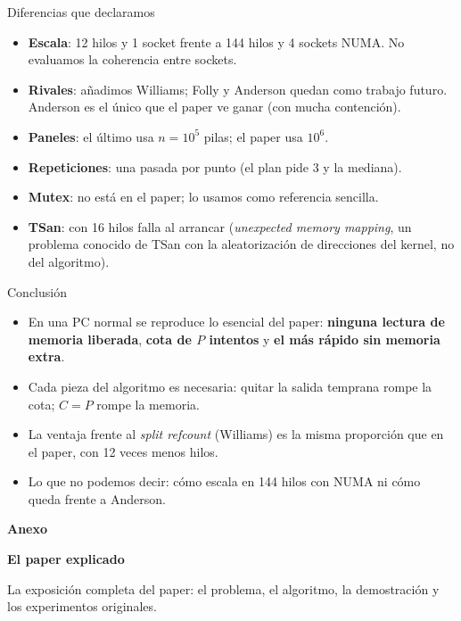 \documentclass[aspectratio=169,11pt]{beamer}
\newcommand{\clave}[1]{\textcolor{acento}{\textbf{#1}}}
\begin{document}
\begin{frame}{Diferencias que declaramos}
  \begin{itemize}\small
    \item \textbf{Escala}: 12 hilos y 1 socket frente a 144 hilos y 4 sockets NUMA. No evaluamos la coherencia entre sockets.
    \item \textbf{Rivales}: añadimos Williams; Folly y Anderson quedan como trabajo futuro. Anderson es el único que el paper ve ganar (con mucha contención).
    \item \textbf{Paneles}: el último usa $n = 10^5$ pilas; el paper usa $10^6$.
    \item \textbf{Repeticiones}: una pasada por punto (el plan pide 3 y la mediana).
    \item \textbf{Mutex}: no está en el paper; lo usamos como referencia sencilla.
    \item \textbf{TSan}: con 16 hilos falla al arrancar (\emph{unexpected memory mapping}, un problema conocido de TSan con la aleatorización de direcciones del kernel, no del algoritmo).
  \end{itemize}
\end{frame}

\begin{frame}{Conclusión}
  \begin{itemize}
    \item En una PC normal se reproduce lo esencial del paper: \clave{ninguna lectura de memoria liberada}, \clave{cota de $P$ intentos} y \clave{el más rápido sin memoria extra}.
    \item Cada pieza del algoritmo es necesaria: quitar la salida temprana rompe la cota; $C = P$ rompe la memoria.
    \item La ventaja frente al \emph{split refcount} (Williams) es la misma proporción que en el paper, con 12 veces menos hilos.
    \item Lo que no podemos decir: cómo escala en 144 hilos con NUMA ni cómo queda frente a Anderson.
  \end{itemize}
  \vfill
\end{frame}

{
\begin{frame}[plain]
  \vfill{\color{acento}\large\bfseries Anexo}\par\medskip
  {\fontsize{30}{34}\selectfont\bfseries El paper explicado}\par\bigskip
  {\color{gris}La exposición completa del paper: el problema, el algoritmo, la demostración y los experimentos originales.}\vfill
\end{frame}}


\end{document}

